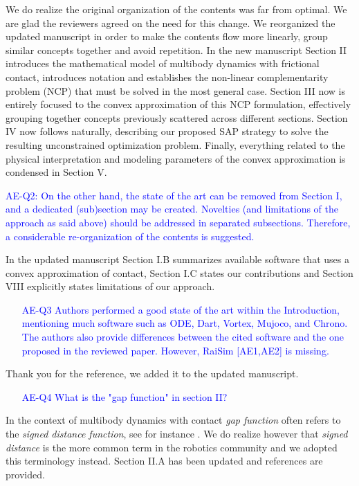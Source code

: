 We do realize the original organization of the contents was far from optimal. We
are glad the reviewers agreed on the need for this change. We reorganized the
updated manuscript in order to make the contents flow more linearly, group
similar concepts together and avoid repetition. In the new manuscript Section II
introduces the mathematical model of multibody dynamics with frictional contact,
introduces notation and establishes the non-linear complementarity problem (NCP)
that must be solved in the most general case. Section III now is entirely
focused to the convex approximation of this NCP formulation, effectively
grouping together concepts previously scattered across different sections.
Section IV now follows naturally, describing our proposed SAP strategy to solve
the resulting unconstrained optimization problem. Finally, everything related to
the physical interpretation and modeling parameters of the convex approximation
is condensed in Section V.

\vspace{5mm}
\textcolor{blue}{AE-Q2: On the other hand, the state of the art can be removed from
Section I, and a dedicated (sub)section may be created. Novelties (and
limitations of the approach as said above) should be addressed in separated
subsections. Therefore, a considerable re-organization of the contents is
suggested.}

In the updated manuscript Section I.B summarizes available software that uses a
convex approximation of contact, Section I.C states our contributions and
Section VIII explicitly states limitations of our approach.

\textcolor{blue}{
\begin{itemize}
    \item[AE-Q3] Authors performed a good state of the art within the Introduction,
    mentioning much software such as ODE, Dart, Vortex, Mujoco, and Chrono. The
    authors also provide differences between the cited software and the one
    proposed in the reviewed paper. However, RaiSim [AE1,AE2] is
    missing.\end{itemize}}

Thank you for the reference, we added it to the updated manuscript.

\textcolor{blue}{
\begin{itemize}
    \item[AE-Q4] What is the "gap function" in section II?\end{itemize}}
    
In the context of multibody dynamics with contact \emph{gap function} often
refers to the \emph{signed distance function}, see for instance
\cite{bib:negrut2018posing, bib:duriez2005realistic,
bib:laursen2003computational}. We do realize however that \emph{signed distance}
is the more common term in the robotics community and we adopted this
terminology instead. Section II.A has been updated and references are provided.

